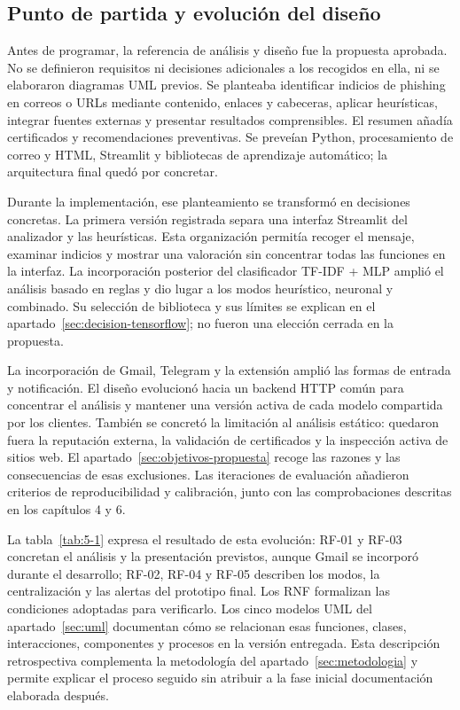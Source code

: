\subsection{Punto de partida y evolución del diseño}
\label{sec:proceso-diseno}

Antes de programar, la referencia de análisis y diseño fue la propuesta aprobada. No se definieron requisitos ni decisiones adicionales a los recogidos en ella, ni se elaboraron diagramas UML previos. Se planteaba identificar indicios de phishing en correos o URLs mediante contenido, enlaces y cabeceras, aplicar heurísticas, integrar fuentes externas y presentar resultados comprensibles. El resumen añadía certificados y recomendaciones preventivas. Se preveían Python, procesamiento de correo y HTML, Streamlit y bibliotecas de aprendizaje automático; la arquitectura final quedó por concretar.

Durante la implementación, ese planteamiento se transformó en decisiones concretas. La primera versión registrada separa una interfaz Streamlit del analizador y las heurísticas. Esta organización permitía recoger el mensaje, examinar indicios y mostrar una valoración sin concentrar todas las funciones en la interfaz. La incorporación posterior del clasificador TF-IDF + MLP amplió el análisis basado en reglas y dio lugar a los modos heurístico, neuronal y combinado. Su selección de biblioteca y sus límites se explican en el apartado~\ref{sec:decision-tensorflow}; no fueron una elección cerrada en la propuesta.

La incorporación de Gmail, Telegram y la extensión amplió las formas de entrada y notificación. El diseño evolucionó hacia un backend HTTP común para concentrar el análisis y mantener una versión activa de cada modelo compartida por los clientes. También se concretó la limitación al análisis estático: quedaron fuera la reputación externa, la validación de certificados y la inspección activa de sitios web. El apartado~\ref{sec:objetivos-propuesta} recoge las razones y las consecuencias de esas exclusiones. Las iteraciones de evaluación añadieron criterios de reproducibilidad y calibración, junto con las comprobaciones descritas en los capítulos 4 y 6.

La tabla~\ref{tab:5-1} expresa el resultado de esta evolución: RF-01 y RF-03 concretan el análisis y la presentación previstos, aunque Gmail se incorporó durante el desarrollo; RF-02, RF-04 y RF-05 describen los modos, la centralización y las alertas del prototipo final. Los RNF formalizan las condiciones adoptadas para verificarlo. Los cinco modelos UML del apartado~\ref{sec:uml} documentan cómo se relacionan esas funciones, clases, interacciones, componentes y procesos en la versión entregada. Esta descripción retrospectiva complementa la metodología del apartado~\ref{sec:metodologia} y permite explicar el proceso seguido sin atribuir a la fase inicial documentación elaborada después.
